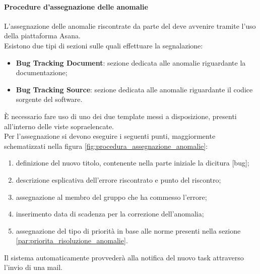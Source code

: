 			\paragraph{Procedure d'assegnazione delle anomalie}
			\label{par:Procedure_assegnazione_delle_anomalie}
			L'assegnazione delle anomalie riscontrate da parte del \roleVerifier{} deve avvenire tramite l'uso della piattaforma Asana.\\
			Esistono due tipi di sezioni sulle quali effettuare la segnalazione:
			\begin{itemize}
				\item \textbf{Bug Tracking Document}: sezione dedicata alle anomalie riguardante la documentazione; 
				\item \textbf{Bug Tracking Source}: sezione dedicata alle anomalie riguardante il codice sorgente del software.
			\end{itemize}
			\noindent
			\`E necessario fare uso di uno dei due template messi a disposizione, presenti all'interno delle viste sopraelencate.\\
			Per l'assegnazione si devono eseguire i seguenti punti, maggiormente schematizzati nella figura \ref{fig:procedura_assegnazione_anomalie}:
			\begin{enumerate}
				\item definizione del nuovo titolo, contenente nella parte iniziale la dicitura {[}bug{]};
				\item descrizione esplicativa dell'errore riscontrato e punto del riscontro;
				\item assegnazione al membro del gruppo che ha commesso l'errore;
				\item inserimento data di scadenza per la correzione dell'anomalia;
				\item assegnazione del tipo di priorità in base alle norme presenti nella sezione \ref{par:priorita_risoluzione_anomalie}.
			\end{enumerate}
			\noindent
			Il sistema automaticamente provvederà alla notifica del nuovo task attraverso l'invio di una mail.
